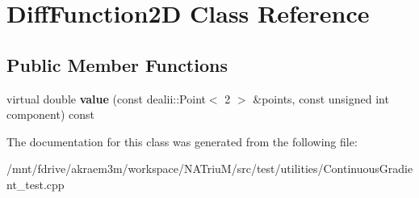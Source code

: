 \hypertarget{classDiffFunction2D}{
\section{DiffFunction2D Class Reference}
\label{classDiffFunction2D}
}
\subsection*{Public Member Functions}
\begin{DoxyCompactItemize}
\item 
\hypertarget{classDiffFunction2D_af8fa31d8793f813b678ee683bdabe4c7}{
virtual double {\bfseries value} (const dealii::Point$<$ 2 $>$ \&points, const unsigned int component) const }
\label{classDiffFunction2D_af8fa31d8793f813b678ee683bdabe4c7}

\end{DoxyCompactItemize}


The documentation for this class was generated from the following file:\begin{DoxyCompactItemize}
\item 
/mnt/fdrive/akraem3m/workspace/NATriuM/src/test/utilities/ContinuousGradient\_\-test.cpp\end{DoxyCompactItemize}
